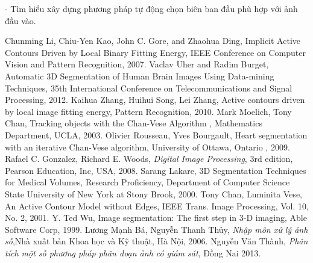 \documentclass[12pt, oneside, a4]{book}
\begin{document}
- Tìm hiểu xây dựng phương pháp tự động chọn biên ban đầu phù hợp với ảnh đầu vào.
\newpage
\begin{thebibliography}{7}
Chunming Li, Chiu-Yen Kao, John C. Gore, and Zhaohua Ding, Implicit Active Contours Driven by Local Binary Fitting Energy,  IEEE Conference on Computer Vision and Pattern Recognition, 2007.
Vaclav Uher and Radim Burget, Automatic 3D Segmentation of Human Brain
Images Using Data-mining Techniques, 35th International Conference on Telecommunications and Signal Processing, 2012.
Kaihua Zhang, Huihui Song, Lei Zhang, Active contours driven by local image fitting energy, Pattern Recognition, 2010.
Mark Moelich, Tony Chan, Tracking objects with the Chan-Vese Algorithm , Mathematics Department, UCLA, 2003.
Olivier Rousseau, Yves Bourgault,  Heart segmentation with an iterative Chan-Vese
algorithm, University of Ottawa, Ontario , 2009.
Rafael C. Gonzalez, Richard E. Woods, \textsl{Digital Image Processing}, 3rd edition, Pearson Education, Inc, USA, 2008.
Sarang Lakare,  3D Segmentation Techniques for Medical Volumes, Research Proficiency, Department of Computer Science State University of New York at Stony Brook, 2000.
Tony Chan, Luminita Vese, An Active Contour Model without Edges, IEEE Trans. Image
Processing, Vol. 10, No. 2,  2001.
Y. Ted Wu, Image segmentation: The first step in 3-D imaging, Able Software Corp,  1999.
Lương Mạnh Bá, Nguyễn Thanh Thủy, \textsl{Nhập môn xử lý ảnh số},Nhà xuất bản Khoa học và Kỹ thuật, Hà Nội, 2006.
Nguyễn Văn Thành, \textsl{Phân tích một số phương pháp phân đoạn ảnh có giám sát}, Đồng Nai 2013.

\end{thebibliography}
\thispagestyle{empty}
\end{document}
